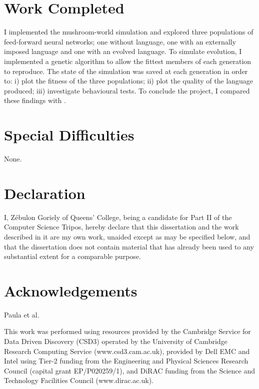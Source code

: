 \documentclass[12pt,a4paper,twoside,openright]{report}
\begin{document}
\section*{Work Completed}

I implemented the mushroom-world simulation and explored three populations of feed-forward neural networks; one without language, one with an externally imposed language and one with an evolved language. To simulate evolution, I implemented a genetic algorithm to allow the fittest members of each generation to reproduce. The state of the simulation was saved at each generation in order to: i) plot the fitness of the three populations; ii) plot the quality of the language produced; iii) investigate behavioural tests. To conclude the project, I compared these findings with \citet{Cangelosi1998}.

\section*{Special Difficulties}

None.
 
\newpage
\section*{Declaration}

I, Z\'ebulon Goriely of Queens' College, being a candidate for Part II of the Computer
Science Tripos, hereby declare
that this dissertation and the work described in it are my own work,
unaided except as may be specified below, and that the dissertation
does not contain material that has already been used to any substantial
extent for a comparable purpose.

\bigskip
{}

\medskip
{}

\tableofcontents

\listoffigures

\newpage
\section*{Acknowledgements}

Paula et al.

This work was performed using resources provided by the Cambridge Service for Data Driven Discovery (CSD3) operated by the University of Cambridge Research Computing Service (www.csd3.cam.ac.uk), provided by Dell EMC and Intel using Tier-2 funding from the Engineering and Physical Sciences Research Council (capital grant EP/P020259/1), and DiRAC funding from the Science and Technology Facilities Council (www.dirac.ac.uk).
\end{document}
